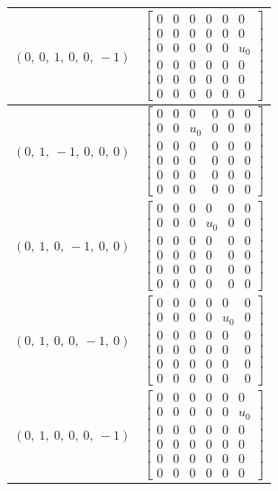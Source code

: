 \documentclass[11pt]{article}
\theoremstyle{definition}
\begin{document}
\begin{longtable}{|l|c|}
    \hline
    $\left( 0, \  0, \  1, \  0, \  0, \  -1\right)$ & ${\left[\begin{matrix}0 & 0 & 0 & 0 & 0 & 0\\0 & 0 & 0 & 0 & 0 & 0\\0 & 0 & 0 & 0 & 0 & u_{0}\\0 & 0 & 0 & 0 & 0 & 0\\0 & 0 & 0 & 0 & 0 & 0\\0 & 0 & 0 & 0 & 0 & 0\end{matrix}\right]}$ \\
    \hline
    $\left( 0, \  1, \  -1, \  0, \  0, \  0\right)$ & ${\left[\begin{matrix}0 & 0 & 0 & 0 & 0 & 0\\0 & 0 & u_{0} & 0 & 0 & 0\\0 & 0 & 0 & 0 & 0 & 0\\0 & 0 & 0 & 0 & 0 & 0\\0 & 0 & 0 & 0 & 0 & 0\\0 & 0 & 0 & 0 & 0 & 0\end{matrix}\right]}$ \\
    \hline
    $\left( 0, \  1, \  0, \  -1, \  0, \  0\right)$ & ${\left[\begin{matrix}0 & 0 & 0 & 0 & 0 & 0\\0 & 0 & 0 & u_{0} & 0 & 0\\0 & 0 & 0 & 0 & 0 & 0\\0 & 0 & 0 & 0 & 0 & 0\\0 & 0 & 0 & 0 & 0 & 0\\0 & 0 & 0 & 0 & 0 & 0\end{matrix}\right]}$ \\
    \hline
    $\left( 0, \  1, \  0, \  0, \  -1, \  0\right)$ & ${\left[\begin{matrix}0 & 0 & 0 & 0 & 0 & 0\\0 & 0 & 0 & 0 & u_{0} & 0\\0 & 0 & 0 & 0 & 0 & 0\\0 & 0 & 0 & 0 & 0 & 0\\0 & 0 & 0 & 0 & 0 & 0\\0 & 0 & 0 & 0 & 0 & 0\end{matrix}\right]}$ \\
    \hline
    $\left( 0, \  1, \  0, \  0, \  0, \  -1\right)$ & ${\left[\begin{matrix}0 & 0 & 0 & 0 & 0 & 0\\0 & 0 & 0 & 0 & 0 & u_{0}\\0 & 0 & 0 & 0 & 0 & 0\\0 & 0 & 0 & 0 & 0 & 0\\0 & 0 & 0 & 0 & 0 & 0\\0 & 0 & 0 & 0 & 0 & 0\end{matrix}\right]}$ \\

\end{longtable}
\end{document}
